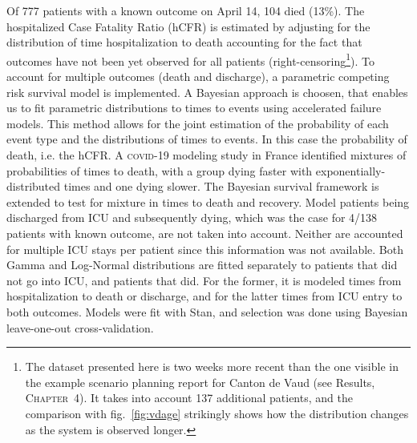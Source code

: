 Of 777 patients with a known outcome on April 14, 104 died (13\%). The hospitalized Case Fatality Ratio (hCFR) is estimated by adjusting for the distribution of time hospitalization to death accounting for the fact that outcomes have not been yet observed for all patients (right-censoring\footnote[][-2\baselineskip]{The dataset presented here is two weeks more recent than the one visible in the example scenario planning report for Canton de Vaud (see Results, \textsc{Chapter~4}). It takes into account 137 additional patients, and the comparison with fig.~\ref{fig:vdage} strikingly shows how the distribution changes as the system is observed longer.}). To account for multiple outcomes (death and discharge), a parametric competing risk survival model is implemented\cite{Ghani:MethodsEstimatingCase:2005}. A Bayesian approach is choosen\cite{Bellot:TreebasedBayesianMixture:2018}, that enables us to fit parametric distributions to times to events using accelerated failure models. This method allows for the joint estimation of the probability of each event type and the distributions of times to events. In this case the probability of death, i.e. the hCFR. A \textsc{covid}-19 modeling study in France identified mixtures of probabilities of times to death, with a group dying faster with exponentially-distributed times and one dying slower\cite{Salje:EstimatingBurdenSARSCoV2:2020}. The Bayesian survival framework is extended to test for mixture in times to death and recovery. Model patients being discharged from ICU and subsequently dying, which was the case for 4/138 patients with known outcome, are not taken into account. Neither are accounted for multiple ICU stays per patient since this information was not available. Both Gamma and Log-Normal distributions are fitted separately to patients that did not go into ICU, and patients that did. For the former, it is modeled times from hospitalization to death or discharge, and for the latter times from ICU entry to both outcomes. Models were fit with Stan\cite[-5\baselineskip]{Carpenter:StanProbabilisticProgramming:2017}, and selection was done using Bayesian leave-one-out cross-validation\cite[-2.5\baselineskip]{Vehtari:PracticalBayesianModel:2017}. \\
